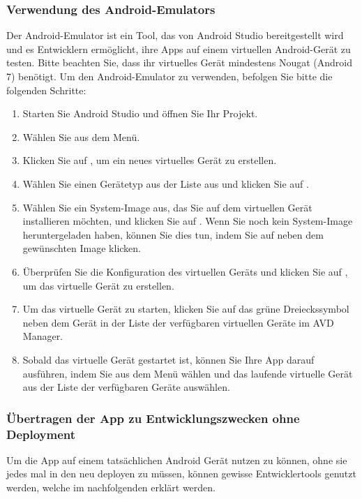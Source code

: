 \subsubsection{Verwendung des Android-Emulators}
Der Android-Emulator ist ein Tool, das von Android Studio bereitgestellt wird und es Entwicklern ermöglicht, ihre Apps auf einem virtuellen Android-Gerät zu testen. Bitte beachten Sie, dass ihr virtuelles Gerät mindestens Nougat (Android 7) benötigt. Um den Android-Emulator zu verwenden, befolgen Sie bitte die folgenden Schritte:\newline
\begin{enumerate}
    \item Starten Sie Android Studio und öffnen Sie Ihr Projekt.
    \item Wählen Sie  aus dem  Menü.
    \item Klicken Sie auf , um ein neues virtuelles Gerät zu erstellen.
    \item Wählen Sie einen Gerätetyp aus der Liste aus und klicken Sie auf .
    \item Wählen Sie ein System-Image aus, das Sie auf dem virtuellen Gerät installieren möchten, und klicken Sie auf . Wenn Sie noch kein System-Image heruntergeladen haben, können Sie dies tun, indem Sie auf  neben dem gewünschten Image klicken.
    \item Überprüfen Sie die Konfiguration des virtuellen Geräts und klicken Sie auf , um das virtuelle Gerät zu erstellen.
    \item Um das virtuelle Gerät zu starten, klicken Sie auf das grüne Dreieckssymbol neben dem Gerät in der Liste der verfügbaren virtuellen Geräte im AVD Manager.
    \item Sobald das virtuelle Gerät gestartet ist, können Sie Ihre App darauf ausführen, indem Sie  aus dem  Menü wählen und das laufende virtuelle Gerät aus der Liste der verfügbaren Geräte auswählen.
\end{enumerate}

\subsubsection{Übertragen der App zu Entwicklungszwecken ohne Deployment}
Um die App auf einem tatsächlichen Android Gerät nutzen zu können, ohne sie jedes mal in den neu deployen zu müssen, können gewisse Entwicklertools genutzt werden, welche im nachfolgenden erklärt werden.
